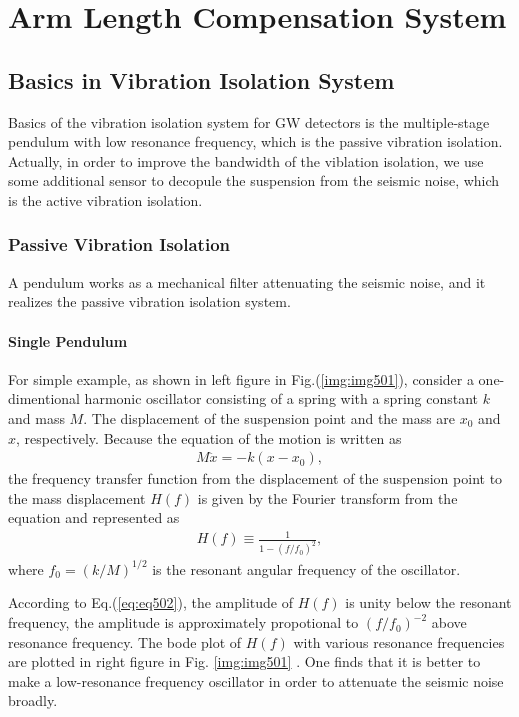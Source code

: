 \chapter{Arm Length Compensation System}





\section{Basics in Vibration Isolation System}
Basics of the vibration isolation system for GW detectors is the multiple-stage pendulum with low resonance frequency, which is the passive vibration isolation. Actually, in order to improve the bandwidth of the viblation isolation, we use some additional sensor to decopule the suspension from the seismic noise, which is the active vibration isolation.

\subsection{Passive Vibration Isolation}
A pendulum works as a mechanical filter attenuating the seismic noise, and it realizes the passive vibration isolation system.

\subsubsection{Single Pendulum}
For simple example, as shown in left figure in Fig.(\ref{img:img501}), consider a one-dimentional harmonic oscillator consisting of a spring with a spring constant $k$ and mass $M$. The displacement of the suspension point and the mass are $x_0$ and $x$, respectively. Because the equation of the motion is written as
\begin{eqnarray} \label{eq:eq501}
  M\ddot{x} = -k(x-x_0),
\end{eqnarray}
the frequency transfer function from the displacement of the suspension point to the mass displacement $H(f)$ is given by the Fourier transform from the equation and represented as
\begin{eqnarray} \label{eq:eq502}
  H(f) \equiv \frac{1}{1-(f/f_0)^2},
\end{eqnarray}
where $f_0 = (k/M)^{1/2}$ is the resonant angular frequency of the oscillator.

According to Eq.(\ref{eq:eq502}), the amplitude of $H(f)$ is unity below the resonant frequency, the amplitude is approximately propotional to $(f/f_0)^{-2}$ above resonance frequency. The bode plot of $H(f)$ with various resonance frequencies are plotted in right figure in Fig. \ref{img:img501} . One finds that it is better to make a low-resonance frequency oscillator in order to attenuate the seismic noise broadly. 

